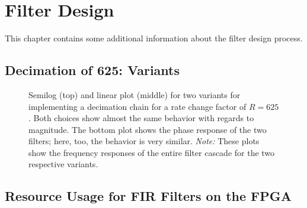 %
%
\chapter{Filter Design} %
\label{ch:app:fdesign}

This  chapter contains  some additional  information about  the filter  design
process.

%
%
\section{Decimation of 625: Variants} %
\label{sec:dec625_variants}

\begin{figure}
    \centering
    
    \caption[Decimation Chain Variants for Rate of 625]{%
        Semilog  (top)  and   linear  plot  (middle)  for   two  variants  for
        implementing  a  decimation   chain  for  a  rate   change  factor  of
        $R=625$. Both choices  show almost the  same behavior with  regards to
        magnitude. The  bottom  plot  shows  the phase  response  of  the  two
        filters; here, too, the behavior  is very similar. \emph{Note:}  These
        plots show  the frequency responses  of the entire filter  cascade for
        the two respective variants.%
    }
    \label{fig:dec625_variants}
\end{figure}

%
%
\section{Resource Usage for FIR Filters on the FPGA} %
\label{sec:fir_filter_resouce_usage}

